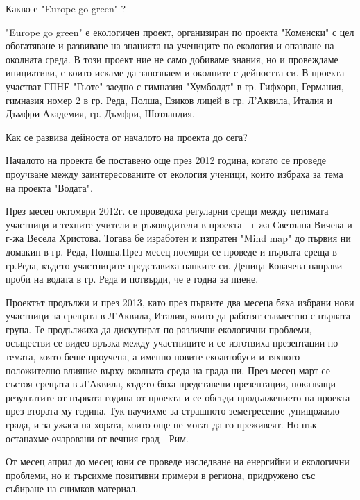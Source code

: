 \begin{multicols}{3}

Какво е "Europe go green" ? 

"Europe go green" е екологичен проект, организиран по проекта "Коменски" с цел обогатяване и развиване на знанията на учениците по екология и опазване на околната среда. В този проект ние не само добиваме знания, но и провеждаме инициативи, с които искаме да запознаем и околните с дейността си. В проекта участват ГПНЕ "Гьоте" заедно с гимназия "Хумболдт" в гр. Гифхорн, Германия,  гимназия номер 2 в гр. Реда, Полша, Езиков лицей в гр. Л'Аквила, Италия и Дъмфри Академия, гр. Дъмфри, Шотландия.

Как се развива дейноста от началото на проекта до сега?

Началото на проекта бе поставено още през 2012 година, когато се проведе проучване между заинтересованите от екология ученици, които избраха за тема на проекта "Водата". 

През месец октомври 2012г. се проведоха регуларни срещи между петимата участници и техните учители и ръководители в проекта - г-жа Светлана Вичева и г-жа Весела Христова. Тогава бе изработен и изпратен "Mind map" до първия ни домакин в гр. Реда, Полша.През месец ноември се проведе и първата среща в гр.Реда, където участниците представиха папките си. Деница Ковачева направи проби на водата в гр. Реда и потвърди, че е годна за пиене.

Проектът продължи и през 2013, като през първите два месеца бяха избрани нови участници за срещата в Л'Аквила, Италия, които да работят съвместно с първата група. Те продължиха да дискутират по различни екологични проблеми, осъществи се видео връзка между участниците и се изготвиха презентации по темата, която беше проучена, а именно новите екоавтобуси и тяхното положително влияние върху околната среда на града ни. През месец март се състоя срещата в Л'Аквила, където бяха представени презентации, показващи резултатите от първата година от проекта и се обсъди продължението на проекта през втората му година. Тук научихме за страшното земетресение ,унищожило града, и за ужаса на хората, които още не могат да го преживеят. Но пък останахме очаровани от вечния град - Рим.

От месец април до месец юни се проведе изследване на енергийни и екологични проблеми, но и търсихме позитивни примери в региона, придружено със събиране на снимков материал.  


\end{multicols}
